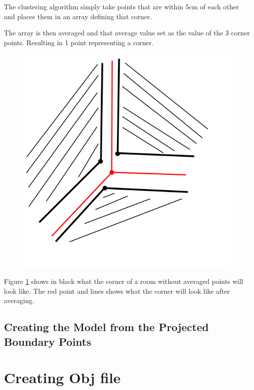 			The clustering algorithm simply take points that are within 5cm of each other and places them in an array defining that corner.
			
			The array is then averaged and that average value set as the value of the 3 corner points. Resulting in 1 point representing a corner.
			
			\begin{figure}
				\centering
				\includegraphics[width=0.7\linewidth]{Includes/images/CornerAveraging}
				\caption{}
				\label{fig:CornerAveraging}
			\end{figure}
			
			Figure \ref{fig:CornerAveraging} shows in black what the corner of a room without averaged points will look like. The red point and lines shows what the corner will look like after averaging.


		\subsection{Creating the Model from the Projected\\ Boundary Points}
			




	\section{Creating Obj file}
			
					
